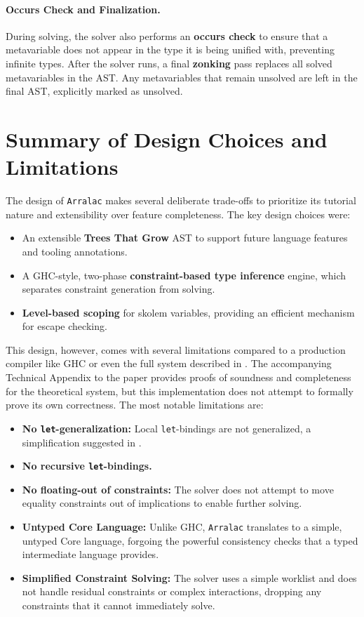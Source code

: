 \paragraph{Occurs Check and Finalization.} During solving, the solver also performs an \textbf{occurs check} to ensure that a metavariable does not appear in the type it is being unified with, preventing infinite types. After the solver runs, a final \textbf{zonking} pass replaces all solved metavariables in the AST. Any metavariables that remain unsolved are left in the final AST, explicitly marked as unsolved.

\section{Summary of Design Choices and Limitations}
\label{sec:Design:Summary}

The design of \texttt{Arralac} makes several deliberate trade-offs to prioritize its tutorial nature and extensibility over feature completeness.
The key design choices were:
\begin{itemize}
    \item An extensible \textbf{Trees That Grow} AST to support future language features and tooling annotations.
    \item A GHC-style, two-phase \textbf{constraint-based type inference} engine, which separates constraint generation from solving.
    \item \textbf{Level-based scoping} for skolem variables, providing an efficient mechanism for escape checking.
\end{itemize}

This design, however, comes with several limitations compared to a production compiler like GHC or even the full system described in \cite{jones-practical-2007}. The accompanying Technical Appendix to the paper \cite{practical-type-inference-proofs} provides proofs of soundness and completeness for the theoretical system, but this implementation does not attempt to formally prove its own correctness. The most notable limitations are:
\begin{itemize}
    \item \textbf{No \texttt{let}-generalization:} Local \texttt{let}-bindings are not generalized, a simplification suggested in \cite{wits-type-inference-using-constraints}.
    \item \textbf{No recursive \texttt{let}-bindings.}
    \item \textbf{No floating-out of constraints:} The solver does not attempt to move equality constraints out of implications to enable further solving.
    \item \textbf{Untyped Core Language:} Unlike GHC, \texttt{Arralac} translates to a simple, untyped Core language, forgoing the powerful consistency checks that a typed intermediate language provides.
    \item \textbf{Simplified Constraint Solving:} The solver uses a simple worklist and does not handle residual constraints or complex interactions, dropping any constraints that it cannot immediately solve.
\end{itemize}
